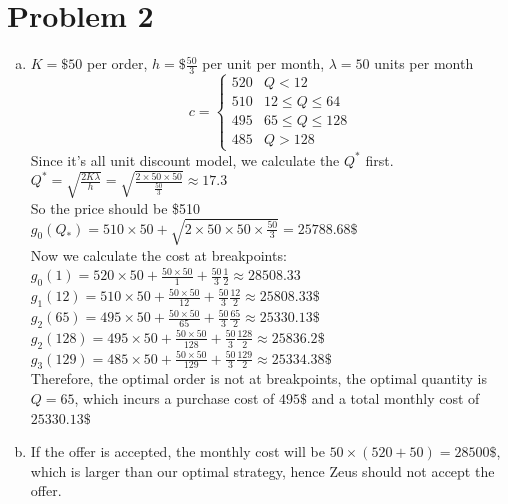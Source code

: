 \documentclass[a4paper]{article}
\begin{document}
\section{Problem 2}
    \begin{enumerate}[(a)]
        \item $K=\$50$ per order, $h=\$\frac{50}{3}$ per unit per month, $\lambda=50$ units per month
        \\\[c=\begin{cases}
            520 & Q<12\\
            510 & 12\leq Q\leq64\\
            495 & 65\leq Q\leq128\\
            485 & Q>128
        \end{cases}\]
        Since it's all unit discount model, we calculate the $Q^*$ first.
        \\$Q^*=\sqrt{\frac{2K\lambda}{h}}=\sqrt{\frac{2\times50\times50}{\frac{50}{3}}}\approx17.3$
        \\So the price should be \$510
        \\$g_0(Q_*)=510\times50+\sqrt{2\times50\times50\times\frac{50}{3}}=25788.68\$$
        \\Now we calculate the cost at breakpoints:
        \\$g_0(1)=520\times50+\frac{50\times50}{1}+\frac{50}{3}\frac{1}{2}\approx28508.33$
        \\$g_1(12)=510\times50+\frac{50\times50}{12}+\frac{50}{3}\frac{12}{2}\approx25808.33\$$
        \\$g_2(65)=495\times50+\frac{50\times50}{65}+\frac{50}{3}\frac{65}{2}\approx25330.13\$$
        \\$g_2(128)=495\times50+\frac{50\times50}{128}+\frac{50}{3}\frac{128}{2}\approx25836.2\$$
        \\$g_3(129)=485\times50+\frac{50\times50}{129}+\frac{50}{3}\frac{129}{2}\approx25334.38\$$
        \\Therefore, the optimal order is not at breakpoints, the optimal quantity is $Q=65$, which incurs a purchase cost of $495\$$ and a total monthly cost of $25330.13\$$
        \item If the offer is accepted, the monthly cost will be $50\times(520+50)=28500\$$, which is larger than our optimal strategy, hence Zeus should not accept the offer.
    \end{enumerate}
\end{document}
